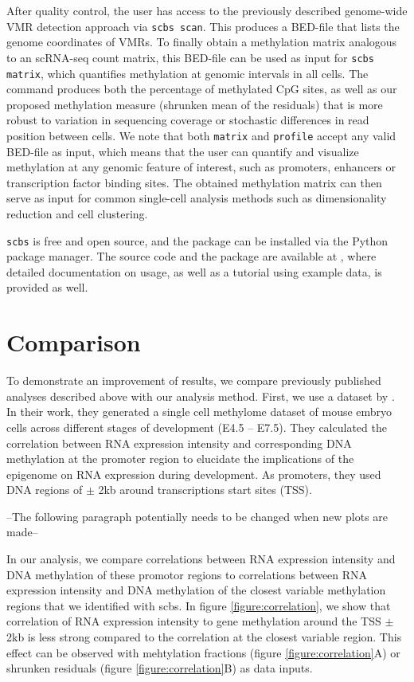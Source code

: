 \documentclass[twocolumn,10pt]{article}
\begin{document}
After quality control, the user has access to the previously described genome-wide VMR detection approach via \texttt{scbs scan}. This produces a BED-file that lists the genome coordinates of VMRs. To finally obtain a methylation matrix analogous to an scRNA-seq count matrix, this BED-file can be used as input for \texttt{scbs matrix}, which quantifies methylation at genomic intervals in all cells. The command produces both the percentage of methylated CpG sites, as well as our proposed methylation measure (shrunken mean of the residuals) that is more robust to variation in sequencing coverage or stochastic differences in read position between cells. We note that both \texttt{matrix} and \texttt{profile} accept any valid BED-file as input, which means that the user can quantify and visualize methylation at any genomic feature of interest, such as promoters, enhancers or transcription factor binding sites. The obtained methylation matrix can then serve as input for common single-cell analysis methods such as dimensionality reduction and cell clustering.

\texttt{scbs} is free and open source, and the package can be installed via the Python package manager. The source code and the package are available at \href{https://github.com/LKremer/scbs}, where detailed documentation on usage, as well as a tutorial using example data, is provided as well.


\section{Comparison}

To demonstrate an improvement of results, we compare previously published analyses described above with our analysis method.
First, we use a dataset by \citealp{Argelaguet_2019}. In their work, they generated a single cell methylome dataset of mouse embryo cells across different stages of development (E4.5 – E7.5). They calculated the correlation between RNA expression intensity and corresponding DNA methylation at the promoter region to elucidate the implications of the epigenome on RNA expression during development. As promoters, they used DNA regions of $\pm$ 2kb around transcriptions start sites (TSS). 


--The following paragraph potentially needs to be changed when new plots are made--


In our analysis, we compare correlations between RNA expression intensity and DNA methylation of these promotor regions to correlations between RNA expression intensity and DNA methylation of the closest variable methylation regions that we identified with scbs. In figure \ref{figure:correlation}, we show that correlation of RNA expression intensity to gene methylation around the TSS $\pm$ 2kb is less strong compared to the correlation at the closest variable region. This effect can be observed with mehtylation fractions (figure \ref{figure:correlation}A) or shrunken residuals (figure \ref{figure:correlation}B) as data inputs.
\end{document}
